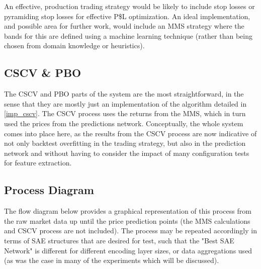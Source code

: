 \documentclass[a4paper,11pt,oneside]{article}
\theoremstyle{plain}
\theoremstyle{definition}
\begin{document}
An effective, production trading strategy would be likely to include stop losses or pyramiding stop losses for effective P\$L optimization. An ideal implementation, and possible area for further work, would include an MMS strategy where the bands for this are defined using a machine learning technique (rather than being chosen from domain knowledge or heuristics).\newline


\subsection{CSCV \& PBO}\label{proc_cscv}

The CSCV and PBO parts of the system are the most straightforward, in the sense that they are mostly just an implementation of the algorithm detailed in \ref{imp_cscv}. The CSCV process uses the returns from the MMS, which in turn used the prices from the predictions network. Conceptually, the whole system comes into place here, as the results from the CSCV process are now indicative of not only backtest overfitting in the trading strategy, but also in the prediction network and without having to consider the impact of many configuration tests for feature extraction.

\subsection{Process Diagram}\label{proc_diagram}

The flow diagram below provides a graphical representation of this process from the raw market data up until the price prediction points (the MMS calculations and CSCV process are not included). The process may be repeated accordingly in terms of SAE structures that are desired for test, such that the "Best SAE Network" is different for different encoding layer sizes, or data aggregations used (as was the case in many of the experiments which will be discussed).
\end{document}
